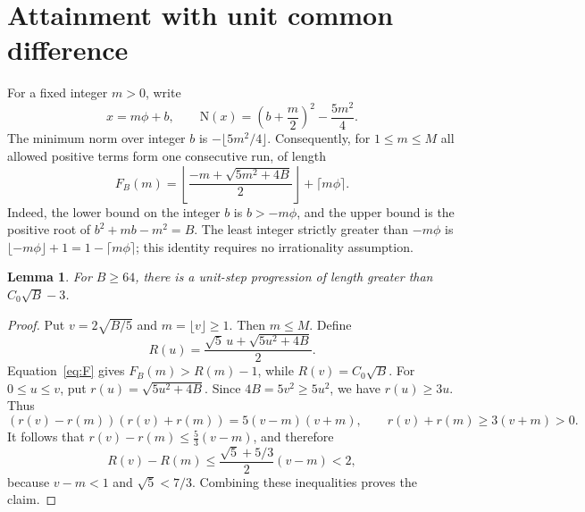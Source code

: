 \documentclass[11pt]{article}
\newtheorem{lemma}[theorem]{Lemma}
\newcommand{\N}{\mathrm N}
\begin{document}
\section{Attainment with unit common difference}
For a fixed integer $m>0$, write
\[
 x=m\phi+b,\qquad
 \N(x)=\left(b+\frac m2\right)^2-\frac{5m^2}4.
\]
The minimum norm over integer $b$ is $-\lfloor5m^2/4\rfloor$. Consequently, for $1\le m\le M$ all allowed positive terms form one consecutive run, of length
\begin{equation}\label{eq:F}
 F_B(m)=\left\lfloor\frac{-m+\sqrt{5m^2+4B}}2\right\rfloor+\lceil m\phi\rceil.
\end{equation}
Indeed, the lower bound on the integer $b$ is $b>-m\phi$, and the upper bound is the positive root of $b^2+mb-m^2=B$. The least integer strictly greater than $-m\phi$ is $\lfloor-m\phi\rfloor+1=1-\lceil m\phi\rceil$; this identity requires no irrationality assumption.

\begin{lemma}\label{lem:lower}
For $B\ge64$, there is a unit-step progression of length greater than $C_0\sqrt B-3$.
\end{lemma}
\begin{proof}
Put $v=2\sqrt{B/5}$ and $m=\lfloor v\rfloor\ge1$. Then $m\le M$. Define
\[
 R(u)=\frac{\sqrt5\,u+\sqrt{5u^2+4B}}2.
\]
Equation~\eqref{eq:F} gives $F_B(m)>R(m)-1$, while $R(v)=C_0\sqrt B$.
For $0\le u\le v$, put $r(u)=\sqrt{5u^2+4B}$. Since $4B=5v^2\ge5u^2$, we have $r(u)\ge3u$. Thus
\[
 (r(v)-r(m))(r(v)+r(m))=5(v-m)(v+m),
 \qquad r(v)+r(m)\ge3(v+m)>0.
\]
It follows that $r(v)-r(m)\le\frac53(v-m)$, and therefore
\[
 R(v)-R(m)\le\frac{\sqrt5+5/3}{2}(v-m)<2,
\]
because $v-m<1$ and $\sqrt5<7/3$. Combining these inequalities proves the claim.
\end{proof}
\end{document}
